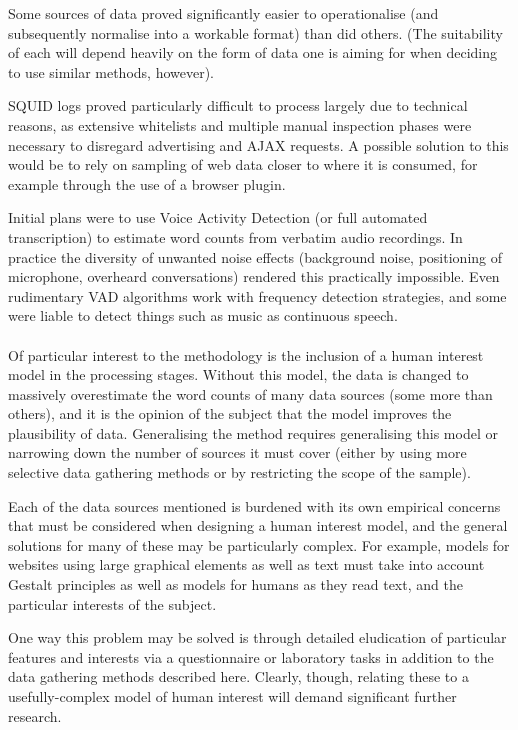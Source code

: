 Some sources of data proved significantly easier to operationalise (and subsequently normalise into a workable format) than did others.  (The suitability of each will depend heavily on the form of data one is aiming for when deciding to use similar methods, however).

SQUID logs proved particularly difficult to process largely due to technical reasons, as extensive whitelists and multiple manual inspection phases were necessary to disregard advertising and AJAX requests.  A possible solution to this would be to rely on sampling of web data closer to where it is consumed, for example through the use of a browser plugin.

Initial plans were to use Voice Activity Detection (or full automated transcription) to estimate word counts from verbatim audio recordings.  In practice the diversity of unwanted noise effects (background noise, positioning of microphone, overheard conversations) rendered this practically impossible.  Even rudimentary VAD algorithms work with frequency detection strategies, and some were liable to detect things such as music as continuous speech.  



\paragraph{}
Of particular interest to the methodology is the inclusion of a human interest model in the processing stages.  Without this model, the data is changed to massively overestimate the word counts of many data sources (some more than others), and it is the opinion of the subject that the model improves the plausibility of data.  Generalising the method requires generalising this model or narrowing down the number of sources it must cover (either by using more selective data gathering methods or by restricting the scope of the sample).  

Each of the data sources mentioned is burdened with its own empirical concerns that must be considered when designing a human interest model, and the general solutions for many of these may be particularly complex.  For example, models for websites using large graphical elements as well as text must take into account Gestalt principles as well as models for humans as they read text, and the particular interests of the subject.

One way this problem may be solved is through detailed eludication of particular features and interests via a questionnaire or laboratory tasks in addition to the data gathering methods described here.  Clearly, though, relating these to a usefully-complex model of human interest will demand significant further research.




